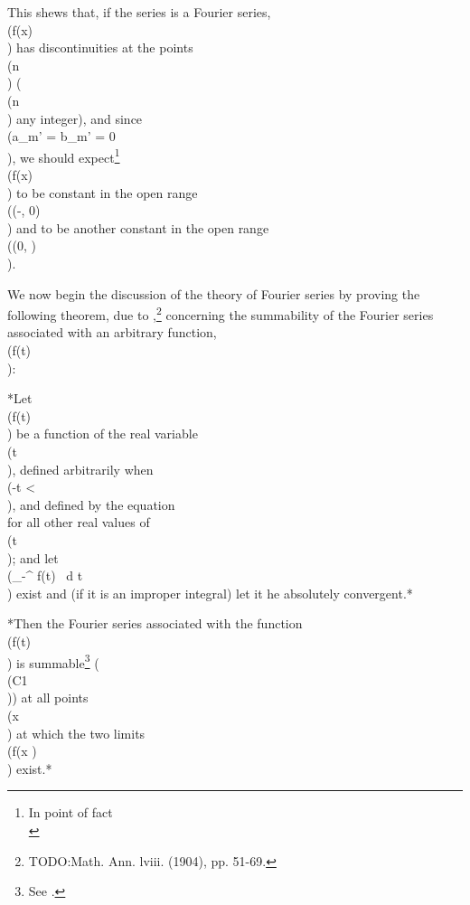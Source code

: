 This shews that, if the
series is a Fourier series, \\(f(x)\\) has discontinuities at the points
\\(n \pi\\) (\\(n\\) any integer), and since \\(a_{m}' = b_{m}' = 0\\), we should
expect\footnote{In point of fact
  \\[ 
  f(x)
  =
  \begin{cases}
    -\frac{1}{4} \pi & -\pi < x < 0;\\
    \frac{1}{4} \pi & 0 < x < \pi.
  \end{cases}
  \\] 
} \\(f(x)\\)
to be constant in the open range \\((-\pi, 0)\\) and to be another constant
in the open range \\((0, \pi)\\).


We now begin the discussion of the theory of Fourier series by proving
the following theorem, due to \Fejer,\footnote{TODO:Math. Ann. lviii. (1904), pp. 51-69.}
concerning the summability of
the Fourier series associated with an arbitrary function, \\(f(t)\\):

*Let \\(f(t)\\) be a function of the real variable \\(t\\), defined arbitrarily
  when \\(-\pi \leq t < \pi\\), and defined by the equation
  \\[ 
  f(t + 2\pi) = f(t)
  \\] 
%
%
  for all other real values of \\(t\\); and let
  \\(\int_{-\pi}^{\pi} f(t) \, d t\\)
  exist and (if it is an improper integral)
  let it he absolutely convergent.*

*Then the Fourier series associated with the function
  \\(f(t)\\) is summable\footnote{See .} (\\(C1\\))
  at all points \\(x\\) at which the two limits \\(f(x )\\) exist.*


